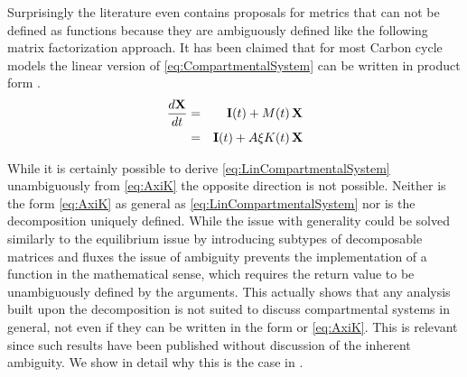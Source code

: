 Surprisingly the literature even contains proposals for metrics that can not be defined as functions because they are ambiguously defined like the following matrix factorization approach.  
It has been claimed that for most Carbon cycle models the linear version of \eqref{eq:CompartmentalSystem} can be written in product form 
\cite{Xia2013GCB, Luo2017Biogeosciences, zhou_sources_2018, zhou_traceability_2021, LiaoDisentangling2022,Luo2022, luo_land_2022}.
\begin{eqnarray} 
  \frac{d\mathbf{X}}{dt} &=& \mathbf{I}(t) + M(t) \, \mathbf{X} 
  \label{eq:LinCompartmentalSystem} 
  \\
                &=& \mathbf{I}(t) + A \xi K(t) \, \mathbf{X}
  \label{eq:AxiK}
\end{eqnarray}

While it is certainly possible to derive \eqref{eq:LinCompartmentalSystem} unambiguously from \eqref{eq:AxiK} the opposite direction is not possible. Neither is the form \eqref{eq:AxiK} as general as \eqref{eq:LinCompartmentalSystem} 
nor is the decomposition uniquely defined.
While the issue with generality could be solved similarly to the equilibrium
issue by introducing subtypes of decomposable matrices and fluxes the issue of
ambiguity prevents the implementation of a function in the mathematical sense, which requires the return value to be unambiguously defined by the arguments.
This actually shows that any analysis built upon the decomposition is not
suited to discuss compartmental systems in general, not even if they can be
written in the form or \eqref{eq:AxiK}. This is relevant since such results have been published without discussion of the inherent ambiguity. We show in detail why this is the case in .


